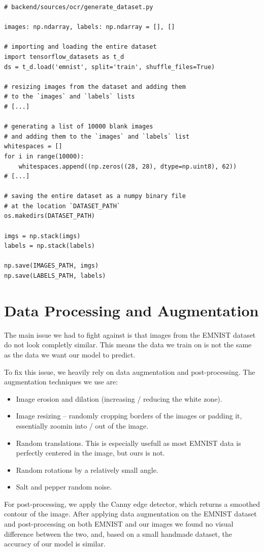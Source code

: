 \documentclass[11pt, a4paper]{report}
\begin{document}
\begin{verbatim}
# backend/sources/ocr/generate_dataset.py

images: np.ndarray, labels: np.ndarray = [], []

# importing and loading the entire dataset
import tensorflow_datasets as t_d
ds = t_d.load('emnist', split='train', shuffle_files=True)

# resizing images from the dataset and adding them
# to the `images` and `labels` lists
# [...]

# generating a list of 10000 blank images
# and adding them to the `images` and `labels` list
whitespaces = []
for i in range(10000):
    whitespaces.append((np.zeros((28, 28), dtype=np.uint8), 62))
# [...]

# saving the entire dataset as a numpy binary file
# at the location `DATASET_PATH`
os.makedirs(DATASET_PATH)

imgs = np.stack(imgs)
labels = np.stack(labels)

np.save(IMAGES_PATH, imgs)
np.save(LABELS_PATH, labels)
\end{verbatim}

\section{Data Processing and Augmentation}

The main issue we had to fight against is that images from the EMNIST dataset do not look completly similar. This means the data we train on is not the same as the data we want our model to predict.

To fix this issue, we heavily rely on data augmentation and post-processing. The augmentation techniques we use are:
\begin{itemize}
	\item Image erosion and dilation (increasing / reducing the white zone).
	\item Image resizing -- randomly cropping borders of the images or padding it, essentially zoomin into / out of the image.
	\item Random translations. This is especially usefull as most EMNIST data is perfectly centered in the image, but ours is not.
	\item Random rotations by a relatively small angle.
	\item Salt and pepper random noise.
\end{itemize}

For post-processing, we apply the Canny edge detector, which returns a smoothed contour of the image. After applying data augmentation on the EMNIST dataset and post-processing on both EMNIST and our images we found no visual difference between the two, and, based on a small handmade dataset, the accuracy of our model is similar.
 
\end{document}
